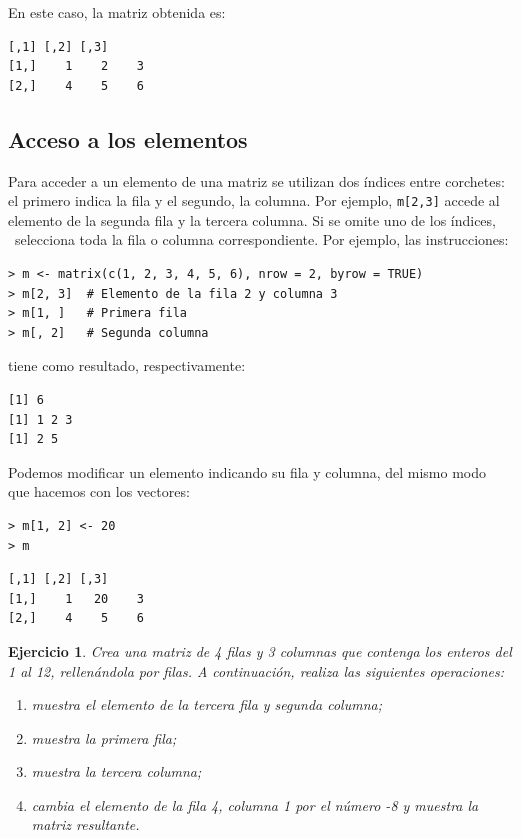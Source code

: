\documentclass[11pt,a4paper]{article}
\newcommand{\R}{\textcolor{azuluc}{\faIcon{r-project}}}
\theoremstyle{exercise}
\newtheorem{exercise}{Ejercicio}
\begin{document}
\noindent En este caso, la matriz obtenida es:

\begin{lstlisting}[style=routput]
     [,1] [,2] [,3]
[1,]    1    2    3
[2,]    4    5    6
\end{lstlisting}

\subsection{Acceso a los elementos}

Para acceder a un elemento de una matriz se utilizan dos índices entre corchetes: el primero indica la fila y el segundo, la columna. Por ejemplo, \texttt{m[2,3]} accede al elemento de la segunda fila y la tercera columna. Si se omite uno de los índices, \R\ selecciona toda la fila o columna correspondiente. Por ejemplo, las instrucciones:

\begin{lstlisting}[style=rconsole]
> m <- matrix(c(1, 2, 3, 4, 5, 6), nrow = 2, byrow = TRUE)
> m[2, 3]  # Elemento de la fila 2 y columna 3
> m[1, ]   # Primera fila
> m[, 2]   # Segunda columna
\end{lstlisting}

\noindent tiene como resultado, respectivamente:

\begin{lstlisting}[style=routput]
[1] 6
[1] 1 2 3
[1] 2 5
\end{lstlisting}

Podemos modificar un elemento indicando su fila y columna, del mismo modo que hacemos con los vectores:

\begin{lstlisting}[style=rstyle]
> m[1, 2] <- 20
> m
\end{lstlisting}

\begin{lstlisting}[style=routput]
     [,1] [,2] [,3]
[1,]    1   20    3
[2,]    4    5    6
\end{lstlisting}

\begin{exercise}
Crea una matriz de 4 filas y 3 columnas que contenga los enteros del 1 al 12, rellenándola por filas. A continuación, realiza las siguientes operaciones:
\begin{enumerate}
    \item muestra el elemento de la tercera fila y segunda columna;
    \item muestra la primera fila;
    \item muestra la tercera columna;
    \item cambia el elemento de la fila 4, columna 1 por el número -8 y muestra la matriz resultante.
\end{enumerate}
\end{exercise}
\end{document}
